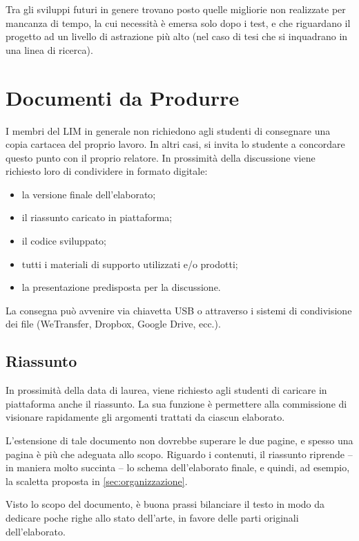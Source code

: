 \documentclass[12pt]{report}
\begin{document}
    Tra gli sviluppi futuri in genere trovano posto quelle migliorie non realizzate per mancanza di tempo, la cui necessità è emersa solo dopo i test, e che riguardano il progetto ad un livello di astrazione più alto (nel caso di tesi che si inquadrano in una linea di ricerca).


%
%

    \appendix


    \chapter{Documenti da Produrre}
    I membri del LIM in generale non richiedono agli studenti di consegnare una copia cartacea del proprio lavoro. In altri casi, si invita lo studente a concordare questo punto con il proprio relatore.
    In prossimità della discussione viene richiesto loro di condividere in formato digitale:
    \begin{itemize}
        \item la versione finale dell'elaborato;
        \item il riassunto caricato in piattaforma;
        \item il codice sviluppato;
        \item tutti i materiali di supporto utilizzati e/o prodotti;
        \item la presentazione predisposta per la discussione.
    \end{itemize}

    La consegna può avvenire via chiavetta USB o attraverso i sistemi di condivisione dei file (WeTransfer, Dropbox, Google Drive, ecc.).


    \section{Riassunto}
    In prossimità della data di laurea, viene richiesto agli studenti di caricare in piattaforma anche il riassunto. La sua funzione è permettere alla commissione di visionare rapidamente gli argomenti trattati da ciascun elaborato.

    L'estensione di tale documento non dovrebbe superare le due pagine, e spesso una pagina è più che adeguata allo scopo. Riguardo i contenuti, il riassunto riprende -- in maniera molto succinta -- lo schema dell'elaborato finale, e quindi, ad esempio, la scaletta proposta in \ref{sec:organizzazione}.

    Visto lo scopo del documento, è buona prassi bilanciare il testo in modo da dedicare poche righe allo stato dell'arte, in favore delle parti originali dell'elaborato.
\end{document}
